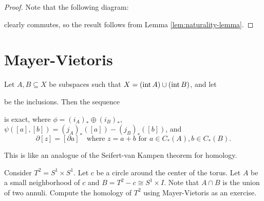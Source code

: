 \begin{proof}
  Note that the following diagram:
  \begin{center}
  \end{center}
  clearly commutes, so the result follows from
  Lemma \ref{lem:naturality-lemma}.
\end{proof}

\section{Mayer-Vietoris}

\begin{theorem}
  Let $A, B \subseteq X$ be subspaces such that
  $X = (\operatorname{int} A) \cup (\operatorname{int} B)$, and let
  \begin{center}
  \end{center}
  be the inclusions. Then the sequence
  \begin{center}
  \end{center}
  is exact, where $\phi = (i_A)_* \oplus (i_B)_*$,
  $\psi([a], [b]) = (j_A)_*([a]) - (j_B)_*([b])$, and
  \[
    \partial [z] = [\partial a]
    \quad \text{where } z = a + b \text{ for } a \in C_*(A), b \in C_*(B).
  \]
\end{theorem}

\begin{remark}
  This is like an analogue of the Seifert-van Kampen
  theorem for homology.
\end{remark}

\begin{example}
  Consider $T^2 = S^1 \times S^1$. Let $c$ be a
  circle around the center of the torus. Let
  $A$ be a small neighborhood of $c$ and
  $B = T^2 - c \cong S^1 \times I$. Note that
  $A \cap B$ is the union of two annuli.
  Compute the homology of $T^2$ using Mayer-Vietoris
  as an exercise.
\end{example}
